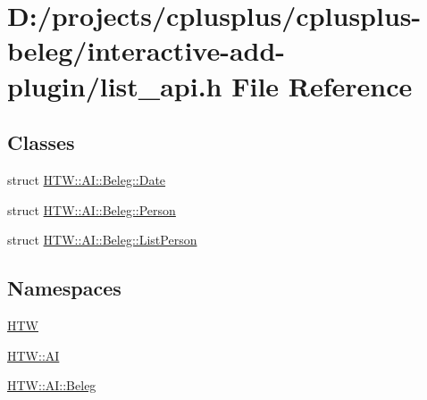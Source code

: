 \hypertarget{interactive-add-plugin_2list__api_8h}{\section{D\-:/projects/cplusplus/cplusplus-\/beleg/interactive-\/add-\/plugin/list\-\_\-api.h File Reference}
\label{interactive-add-plugin_2list__api_8h}
}
\subsection*{Classes}
\begin{DoxyCompactItemize}
\item 
struct \hyperlink{struct_h_t_w_1_1_a_i_1_1_beleg_1_1_date}{H\-T\-W\-::\-A\-I\-::\-Beleg\-::\-Date}
\item 
struct \hyperlink{struct_h_t_w_1_1_a_i_1_1_beleg_1_1_person}{H\-T\-W\-::\-A\-I\-::\-Beleg\-::\-Person}
\item 
struct \hyperlink{struct_h_t_w_1_1_a_i_1_1_beleg_1_1_list_person}{H\-T\-W\-::\-A\-I\-::\-Beleg\-::\-List\-Person}
\end{DoxyCompactItemize}
\subsection*{Namespaces}
\begin{DoxyCompactItemize}
\item 
\hyperlink{namespace_h_t_w}{H\-T\-W}
\item 
\hyperlink{namespace_h_t_w_1_1_a_i}{H\-T\-W\-::\-A\-I}
\item 
\hyperlink{namespace_h_t_w_1_1_a_i_1_1_beleg}{H\-T\-W\-::\-A\-I\-::\-Beleg}
\end{DoxyCompactItemize}
